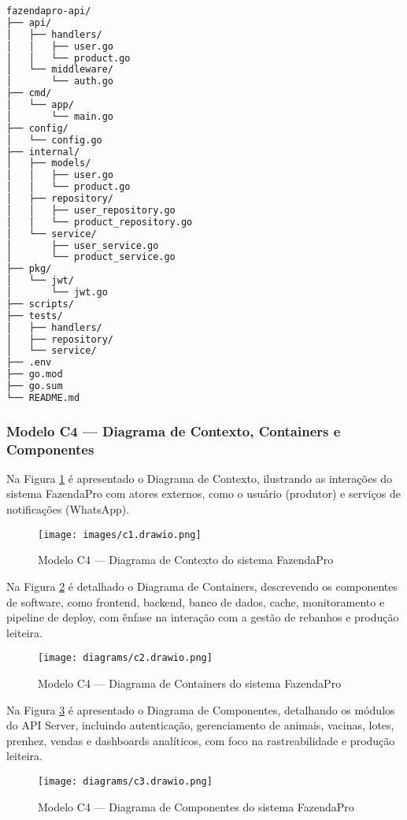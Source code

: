 \documentclass[12pt, a4paper]{article}
\begin{document}
\begin{lstlisting}[language=bash, caption={Estrutura de Diretórios do Projeto}]
fazendapro-api/
├── api/
│   ├── handlers/
│   │   ├── user.go
│   │   └── product.go
│   └── middleware/
│       └── auth.go
├── cmd/
│   └── app/
│       └── main.go
├── config/
│   └── config.go
├── internal/
│   ├── models/
│   │   ├── user.go
│   │   └── product.go
│   ├── repository/
│   │   ├── user_repository.go
│   │   └── product_repository.go
│   └── service/
│       ├── user_service.go
│       └── product_service.go
├── pkg/
│   └── jwt/
│       └── jwt.go
├── scripts/
├── tests/
│   ├── handlers/
│   ├── repository/
│   └── service/
├── .env
├── go.mod
├── go.sum
└── README.md
\end{lstlisting}

\subsubsection{Modelo C4 — Diagrama de Contexto, Containers e Componentes}
\begin{spacing}{1.5}
Na Figura \ref{fig:C4-Contexto} é apresentado o Diagrama de Contexto, ilustrando as interações do sistema FazendaPro com atores externos, como o usuário (produtor) e serviços de notificações (WhatsApp).

\begin{figure}[H]
    \centering
    \texttt{[image: images/c1.drawio.png]}
    \caption{Modelo C4 — Diagrama de Contexto do sistema FazendaPro}
    \label{fig:C4-Contexto}
\end{figure}

\vspace{0.5cm}

Na Figura \ref{fig:C4-Containers} é detalhado o Diagrama de Containers, descrevendo os componentes de software, como frontend, backend, banco de dados, cache, monitoramento e pipeline de deploy, com ênfase na interação com a gestão de rebanhos e produção leiteira.

\begin{figure}[H]
    \centering
    \texttt{[image: diagrams/c2.drawio.png]}
    \caption{Modelo C4 — Diagrama de Containers do sistema FazendaPro}
    \label{fig:C4-Containers}
\end{figure}

\vspace{0.5cm}

Na Figura \ref{fig:C4-Componentes} é apresentado o Diagrama de Componentes, detalhando os módulos do API Server, incluindo autenticação, gerenciamento de animais, vacinas, lotes, prenhez, vendas e dashboards analíticos, com foco na rastreabilidade e produção leiteira.

\begin{figure}[H]
    \centering
    \texttt{[image: diagrams/c3.drawio.png]}
    \caption{Modelo C4 — Diagrama de Componentes do sistema FazendaPro}
    \label{fig:C4-Componentes}
\end{figure}
\end{spacing}
\end{document}
